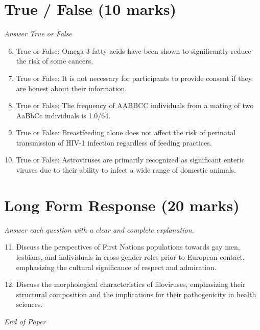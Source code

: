 \documentclass[12pt]{article}
\begin{document}
\section*{True / False (10 marks)}
\textit{Answer True or False}
\begin{enumerate}[label=\arabic*.]
\setcounter{enumi}{5}
\item True or False: Omega-3 fatty acids have been shown to significantly reduce the risk of some cancers.
\item True or False: It is not necessary for participants to provide consent if they are honest about their information.
\item True or False: The frequency of AABBCC individuals from a mating of two AaBbCc individuals is 1.0/64.
\item True or False: Breastfeeding alone does not affect the risk of perinatal transmission of HIV-1 infection regardless of feeding practices.
\item True or False: Astroviruses are primarily recognized as significant enteric viruses due to their ability to infect a wide range of domestic animals.
\end{enumerate}

\section*{Long Form Response (20 marks)}
\textit{Answer each question with a clear and complete explanation.}
\begin{enumerate}[label=\arabic*.]
\setcounter{enumi}{10}
\item Discuss the perspectives of First Nations populations towards gay men, lesbians, and individuals in cross-gender roles prior to European contact, emphasizing the cultural significance of respect and admiration.
\item Discuss the morphological characteristics of filoviruses, emphasizing their structural composition and the implications for their pathogenicity in health sciences.
\end{enumerate}

\vfill
\noindent\textit{End of Paper}
\end{document}
